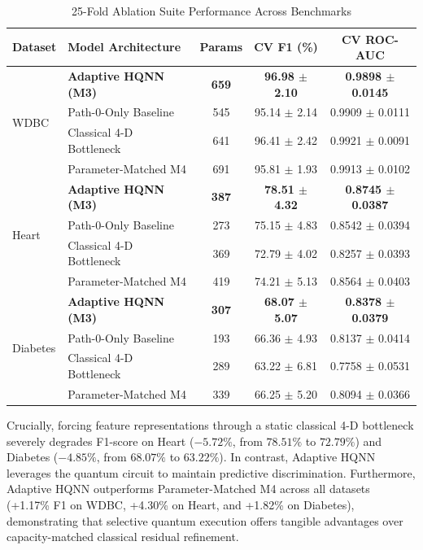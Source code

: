 \documentclass[conference]{IEEEtran}
\begin{document}
\begin{table}[htbp]
\caption{25-Fold Ablation Suite Performance Across Benchmarks}
\label{tab:ablations}
\centering
\begin{tabular}{llccc}
\toprule
Dataset & Model Architecture & Params & CV F1 (\%) & CV ROC-AUC \\
\midrule
\multirow{4}{*}{WDBC} 
& \textbf{Adaptive HQNN (M3)} & \textbf{659} & \textbf{96.98 $\pm$ 2.10} & \textbf{0.9898 $\pm$ 0.0145} \\
& Path-0-Only Baseline & 545 & 95.14 $\pm$ 2.14 & 0.9909 $\pm$ 0.0111 \\
& Classical 4-D Bottleneck & 641 & 96.41 $\pm$ 2.42 & 0.9921 $\pm$ 0.0091 \\
& Parameter-Matched M4 & 691 & 95.81 $\pm$ 1.93 & 0.9913 $\pm$ 0.0102 \\
\midrule
\multirow{4}{*}{Heart} 
& \textbf{Adaptive HQNN (M3)} & \textbf{387} & \textbf{78.51 $\pm$ 4.32} & \textbf{0.8745 $\pm$ 0.0387} \\
& Path-0-Only Baseline & 273 & 75.15 $\pm$ 4.83 & 0.8542 $\pm$ 0.0394 \\
& Classical 4-D Bottleneck & 369 & 72.79 $\pm$ 4.02 & 0.8257 $\pm$ 0.0393 \\
& Parameter-Matched M4 & 419 & 74.21 $\pm$ 5.13 & 0.8564 $\pm$ 0.0403 \\
\midrule
\multirow{4}{*}{Diabetes} 
& \textbf{Adaptive HQNN (M3)} & \textbf{307} & \textbf{68.07 $\pm$ 5.07} & \textbf{0.8378 $\pm$ 0.0379} \\
& Path-0-Only Baseline & 193 & 66.36 $\pm$ 4.93 & 0.8137 $\pm$ 0.0414 \\
& Classical 4-D Bottleneck & 289 & 63.22 $\pm$ 6.81 & 0.7758 $\pm$ 0.0531 \\
& Parameter-Matched M4 & 339 & 66.25 $\pm$ 5.20 & 0.8094 $\pm$ 0.0366 \\
\bottomrule
\end{tabular}
\end{table}

Crucially, forcing feature representations through a static classical 4-D bottleneck severely degrades F1-score on Heart ($-5.72\%$, from $78.51\%$ to $72.79\%$) and Diabetes ($-4.85\%$, from $68.07\%$ to $63.22\%$). In contrast, Adaptive HQNN leverages the quantum circuit to maintain predictive discrimination. Furthermore, Adaptive HQNN outperforms Parameter-Matched M4 across all datasets (+1.17\% F1 on WDBC, +4.30\% on Heart, and +1.82\% on Diabetes), demonstrating that selective quantum execution offers tangible advantages over capacity-matched classical residual refinement.
\end{document}
